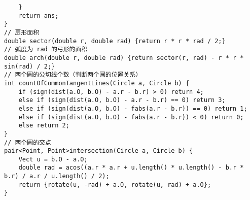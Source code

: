 \begin{verbatim}
    }
    return ans;
}
// 扇形面积
double sector(double r, double rad) {return r * r * rad / 2;}
// 弧度为 rad 的弓形的面积
double arch(double r, double rad) {return sector(r, rad) - r * r * sin(rad) / 2;}
// 两个圆的公切线个数（判断两个圆的位置关系）
int countOfCommonTangentLines(Circle a, Circle b) {
    if (sign(dist(a.O, b.O) - a.r - b.r) > 0) return 4;
    else if (sign(dist(a.O, b.O) - a.r - b.r) == 0) return 3;
    else if (sign(dist(a.O, b.O) - fabs(a.r - b.r)) == 0) return 1;
    else if (sign(dist(a.O, b.O) - fabs(a.r - b.r)) < 0) return 0;
    else return 2;
}
// 两个圆的交点
pair<Point, Point>intersection(Circle a, Circle b) {
    Vect u = b.O - a.O;
    double rad = acos((a.r * a.r + u.length() * u.length() - b.r * b.r) / a.r / u.length() / 2);
    return {rotate(u, -rad) + a.O, rotate(u, rad) + a.O};
}
\end{verbatim}